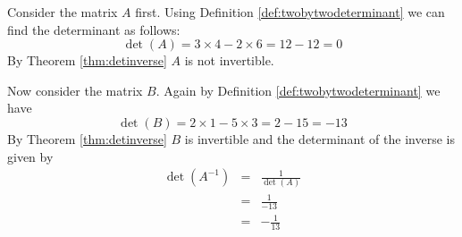 \begin{solution}
Consider the matrix $A$ first. Using Definition \ref{def:twobytwodeterminant} we can find the determinant as follows:
\[
\det \left( A \right) = 3 \times 4 - 2 \times 6 = 12 - 12 = 0
\]
By Theorem \ref{thm:detinverse} $A$ is not invertible.

Now consider the matrix $B$. Again by Definition \ref{def:twobytwodeterminant} we have 
\[
\det \left( B \right) = 2 \times 1 - 5 \times 3 = 2 - 15 = -13
\]
By Theorem \ref{thm:detinverse} $B$ is invertible and the determinant of the inverse is given by 
\begin{eqnarray*}
\det \left( A^{-1} \right) &=& \frac{1}{\det(A)} \\
&=& \frac{1}{-13} \\
&=& -\frac{1}{13}
\end{eqnarray*}

\end{solution}